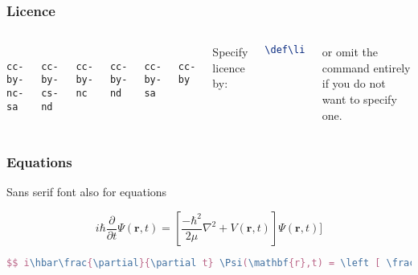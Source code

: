 \documentclass[handout,aspectratio=169]{beamer}
\def\licence{cc-by-nc-sa}
\begin{document}
\begin{frame}[fragile]
    \frametitle{Licence}

    \begin{columns}
        \centering

         \\ {\tt cc-by-nc-sa}

        \vspace{3pt} \\ {\tt cc-by-cs-nd}

        \vspace{3pt} \\ {\tt cc-by-nc}

        \centering

         \\ {\tt cc-by-nd}

        \vspace{3pt} \\ {\tt cc-by-sa}

        \vspace{3pt} \\ {\tt cc-by}

        Specify licence by:
\begin{lstlisting}[language=TeX]
\def\licence{cc-by-nc-sa}
\end{lstlisting}

    or omit the command entirely if you do not want to specify one.

    \end{columns}


\end{frame}


\begin{frame}[fragile]
    \frametitle{Equations}

    \centering Sans serif font also for equations

    $$i\hbar\frac{\partial}{\partial t} \Psi(\mathbf{r},t) = \left [ \frac{-\hbar^2}{2\mu}\nabla^2 + V(\mathbf{r},t)\right ] \Psi(\mathbf{r},t) ]$$

    \begin{lstlisting}[language=TeX]
$$ i\hbar\frac{\partial}{\partial t} \Psi(\mathbf{r},t) = \left [ \frac{-\hbar^2}{2\mu}\nabla^2 + V(\mathbf{r},t)\right ] \Psi(\mathbf{r},t) ]$$
    \end{lstlisting}

\end{frame}
\end{document}
